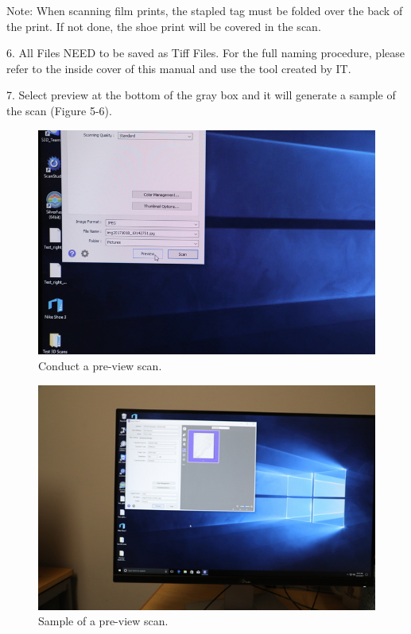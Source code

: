 Note: When scanning film prints, the stapled tag must be folded over the back of the print. If not done, the shoe print will be covered in the scan. 

6.  All Files NEED to be saved as Tiff Files. For the full naming procedure, please refer to the inside cover of this manual and use the tool created by IT. 



7. Select preview at the bottom of the gray box and it will generate a sample of the scan (Figure 5-6). 

\begin{figure}[!htp]
\centering
\includegraphics[scale=0.5]{Bed_Screen_4}
\caption{Conduct a pre-view scan.}
\label{Image 5}
\end{figure}

\begin{figure}[!htp]
\centering
\includegraphics[scale=0.5]{Bed_Screen_5}
\caption{Sample of a pre-view scan.}
\label{Image 6}
\end{figure}

